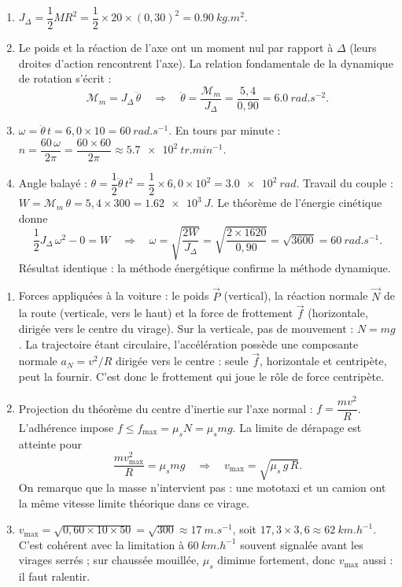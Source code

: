 \documentclass[11pt]{article}
\begin{document}
\begin{corrige}
\begin{enumerate}
\item $J_\Delta = \dfrac{1}{2}MR^2 = \dfrac{1}{2} \times 20 \times (0{,}30)^2 = \SI{0,90}{kg.m^2}$.
\item Le poids et la réaction de l'axe ont un moment nul par rapport à $\Delta$ (leurs droites d'action rencontrent l'axe). La relation fondamentale de la dynamique de rotation s'écrit :
\[ \mathcal{M}_m = J_\Delta\,\ddot{\theta} \quad\Rightarrow\quad \ddot{\theta} = \frac{\mathcal{M}_m}{J_\Delta} = \frac{5{,}4}{0{,}90} = \SI{6,0}{rad.s^{-2}}. \]
\item $\omega = \ddot{\theta}\,t = 6{,}0 \times 10 = \SI{60}{rad.s^{-1}}$. En tours par minute : $n = \dfrac{60\,\omega}{2\pi} = \dfrac{60 \times 60}{2\pi} \approx \SI{5,7e2}{tr.min^{-1}}$.
\item Angle balayé : $\theta = \dfrac{1}{2}\ddot{\theta}\,t^2 = \dfrac{1}{2} \times 6{,}0 \times 10^2 = \SI{3,0e2}{rad}$. Travail du couple : $W = \mathcal{M}_m\,\theta = 5{,}4 \times 300 = \SI{1,62e3}{J}$. Le théorème de l'énergie cinétique donne
\[ \frac{1}{2}J_\Delta\,\omega^2 - 0 = W \quad\Rightarrow\quad \omega = \sqrt{\frac{2W}{J_\Delta}} = \sqrt{\frac{2 \times 1620}{0{,}90}} = \sqrt{3600} = \SI{60}{rad.s^{-1}}. \]
Résultat identique : la méthode énergétique confirme la méthode dynamique.
\end{enumerate}
\end{corrige}

\begin{corrige}
\begin{enumerate}
\item Forces appliquées à la voiture : le poids $\vec{P}$ (vertical), la réaction normale $\vec{N}$ de la route (verticale, vers le haut) et la force de frottement $\vec{f}$ (horizontale, dirigée vers le centre du virage). Sur la verticale, pas de mouvement : $N = mg$. La trajectoire étant circulaire, l'accélération possède une composante normale $a_N = v^2/R$ dirigée vers le centre : seule $\vec{f}$, horizontale et centripète, peut la fournir. C'est donc le frottement qui joue le rôle de force centripète.
\item Projection du théorème du centre d'inertie sur l'axe normal : $f = \dfrac{mv^2}{R}$. L'adhérence impose $f \leq f_{\max} = \mu_s N = \mu_s mg$. La limite de dérapage est atteinte pour
\[ \frac{mv_{\max}^2}{R} = \mu_s mg \quad\Rightarrow\quad v_{\max} = \sqrt{\mu_s\,g\,R}. \]
On remarque que la masse n'intervient pas : une mototaxi et un camion ont la même vitesse limite théorique dans ce virage.
\item $v_{\max} = \sqrt{0{,}60 \times 10 \times 50} = \sqrt{300} \approx \SI{17}{m.s^{-1}}$, soit $17{,}3 \times 3{,}6 \approx \SI{62}{km.h^{-1}}$. C'est cohérent avec la limitation à $\SI{60}{km.h^{-1}}$ souvent signalée avant les virages serrés ; sur chaussée mouillée, $\mu_s$ diminue fortement, donc $v_{\max}$ aussi : il faut ralentir.
\end{enumerate}
\end{corrige}
\end{document}
